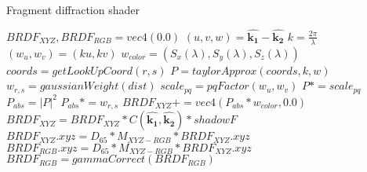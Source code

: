 \begin{algorithm}
  \caption{Fragment diffraction shader}
  \begin{algorithmic}
      \State $BRDF_{XYZ}, BRDF_{RGB} = vec4(0.0)$
      \State $(u,v,w) = \hat{\mathbf{k_1}}-\hat{\mathbf{k_2}}$
        \State $k = \frac{2\pi}{\lambda}$
        \State $(w_u, w_v) = (ku, kv)$
        \State $w_{color} = (S_x(\lambda), S_y(\lambda), S_z(\lambda))$
            \State $coords = getLookUpCoord(r, s)$
            \State $P = taylorApprox(coords, k, w)$
            \State $w_{r,s} = gaussianWeight(dist)$
            \State $scale_{pq} = pqFactor(w_u, w_v)$
            \State $P *= scale_{pq}$
            \State $P_{abs} = \left|P\right|^2$
            \State $P_{abs} *= w_{r,s}$
            \State $BRDF_{XYZ} += vec4(P_{abs}*w_{color}, 0.0)$
          \EndFor
        \EndFor
      \EndFor
      \State $BRDF_{XYZ} = BRDF_{XYZ}*C(\hat{\mathbf{k_1}},\hat{\mathbf{k_2}})*shadowF$
      \State $BRDF_{XYZ}.xyz = D_{65}*M_{XYZ-RGB}*BRDF_{XYZ}.xyz$
      \State $BRDF_{RGB}.xyz = D_{65}*M_{XYZ-RGB}*BRDF_{XYZ}.xyz$
      \State $BRDF_{RGB}= gammaCorrect(BRDF_{RGB})$
    \EndFor
  \end{algorithmic}
\end{algorithm}